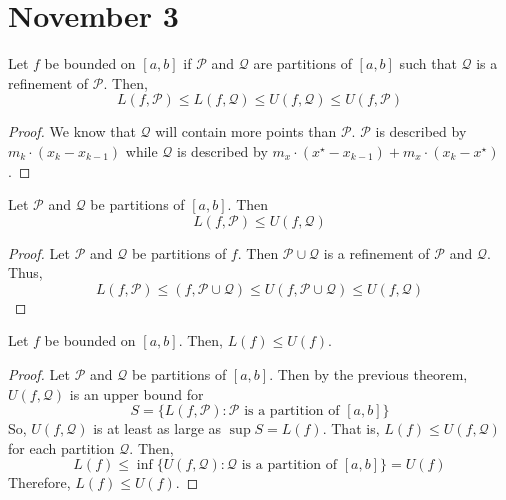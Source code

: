 \section*{November 3}

\begin{theorem}
    Let $f$ be bounded on $[a, b]$ if $\mathcal{P}$ and $\mathcal{Q}$ are partitions of $[a, b]$ such that $\mathcal{Q}$ is a refinement of $\mathcal{P}$. Then, $$L(f, \mathcal{P}) \leq L(f, \mathcal{Q}) \leq U(f, \mathcal{Q}) \leq U(f, \mathcal{P})$$
\end{theorem}
\begin{proof}
    We know that $\mathcal{Q}$ will contain more points than $\mathcal{P}$. $\mathcal{P}$ is described by $m_k \cdot (x_k - x_{k - 1})$ while $\mathcal{Q}$ is described by $m_x \cdot (x^\star - x_{k - 1}) + m_x \cdot (x_k - x^\star)$.
\end{proof}

\begin{theorem}
    Let $\mathcal{P}$ and $\mathcal{Q}$ be partitions of $[a, b]$. Then $$L(f, \mathcal{P}) \leq U(f, \mathcal{Q})$$
\end{theorem}
\begin{proof}
    Let $\mathcal{P}$ and $\mathcal{Q}$ be partitions of $f$. Then $\mathcal{P} \cup \mathcal{Q}$ is a refinement of $\mathcal{P}$ and $\mathcal{Q}$. Thus, $$L(f, \mathcal{P}) \leq (f, \mathcal{P} \cup \mathcal{Q}) \leq U(f, \mathcal{P} \cup \mathcal{Q}) \leq U(f, \mathcal{Q})$$
\end{proof}

\begin{theorem}
    Let $f$ be bounded on $[a, b]$. Then, $L(f) \leq U(f)$.
\end{theorem}
\begin{proof}
    Let $\mathcal{P}$ and $\mathcal{Q}$ be partitions of $[a, b]$. Then by the previous theorem, $U(f, \mathcal{Q})$ is an upper bound for $$S = \{L(f, \mathcal{P}) : \text{$\mathcal{P}$ is a partition of $[a, b]$}\}$$
    So, $U(f, \mathcal{Q})$ is at least as large as $\sup S = L(f)$. That is, $L(f) \leq U(f, \mathcal{Q})$ for each partition $\mathcal{Q}$. Then, $$L(f) \leq \inf\{U(f, \mathcal{Q}) : \text{$\mathcal{Q}$ is a partition of $[a, b]$}\} = U(f)$$
    Therefore, $L(f) \leq U(f)$.
\end{proof}

